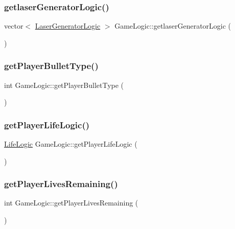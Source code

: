 \subsubsection{\texorpdfstring{getlaser\+Generator\+Logic()}{getlaserGeneratorLogic()}}
{\footnotesize\ttfamily vector$<$ \hyperlink{class_laser_generator_logic}{Laser\+Generator\+Logic} $>$ Game\+Logic\+::getlaser\+Generator\+Logic (\begin{DoxyParamCaption}{ }\end{DoxyParamCaption})}

\mbox{\label{class_game_logic_a933e3cb807803f40baa6dd8dffedd000}} 
\subsubsection{\texorpdfstring{get\+Player\+Bullet\+Type()}{getPlayerBulletType()}}
{\footnotesize\ttfamily int Game\+Logic\+::get\+Player\+Bullet\+Type (\begin{DoxyParamCaption}{ }\end{DoxyParamCaption})}

\mbox{\label{class_game_logic_ad30541663e6b28e997646173fbdf344e}} 
\subsubsection{\texorpdfstring{get\+Player\+Life\+Logic()}{getPlayerLifeLogic()}}
{\footnotesize\ttfamily \hyperlink{class_life_logic}{Life\+Logic} Game\+Logic\+::get\+Player\+Life\+Logic (\begin{DoxyParamCaption}{ }\end{DoxyParamCaption})}

\mbox{\label{class_game_logic_a42fb536e1740b6eeb4f80840250d685f}} 
\subsubsection{\texorpdfstring{get\+Player\+Lives\+Remaining()}{getPlayerLivesRemaining()}}
{\footnotesize\ttfamily int Game\+Logic\+::get\+Player\+Lives\+Remaining (\begin{DoxyParamCaption}{ }\end{DoxyParamCaption})}

